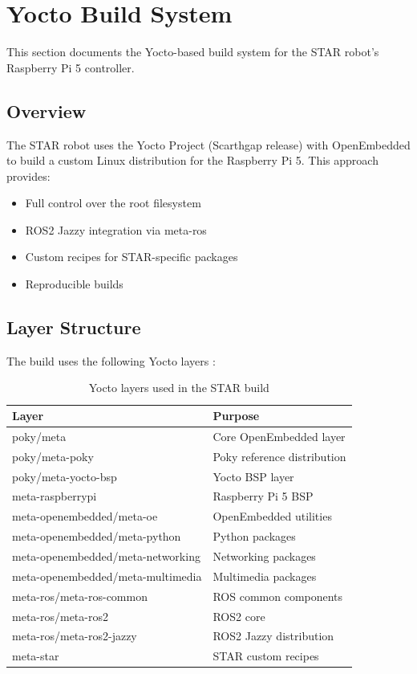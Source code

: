 
\section{Yocto Build System
}
\label{sec:yocto-build}

This section documents the Yocto-based build system for the STAR robot's Raspberry Pi 5 controller.

\subsection{Overview}

The STAR robot uses the Yocto Project (Scarthgap release) with OpenEmbedded to build a custom Linux distribution for the Raspberry Pi 5. This approach provides:

\begin{itemize}
    \item Full control over the root filesystem
    \item ROS2 Jazzy integration via meta-ros
    \item Custom recipes for STAR-specific packages
    \item Reproducible builds
\end{itemize}

    \subsection{Layer Structure}

    The build uses the following Yocto layers :

\begin{table}[h]
\centering
\begin{tabular}{|l|l|}
\hline
\textbf{Layer} & \textbf{Purpose} \\
\hline
poky/meta & Core OpenEmbedded layer \\
poky/meta-poky & Poky reference distribution \\
poky/meta-yocto-bsp & Yocto BSP layer \\
meta-raspberrypi & Raspberry Pi 5 BSP \\
meta-openembedded/meta-oe & OpenEmbedded utilities \\
meta-openembedded/meta-python & Python packages \\
meta-openembedded/meta-networking & Networking packages \\
meta-openembedded/meta-multimedia & Multimedia packages \\
meta-ros/meta-ros-common & ROS common components \\
meta-ros/meta-ros2 & ROS2 core \\
meta-ros/meta-ros2-jazzy & ROS2 Jazzy distribution \\
meta-star & STAR custom recipes \\
\hline
\end{tabular}
    \caption { Yocto layers used in the STAR build}
    \end{table}


